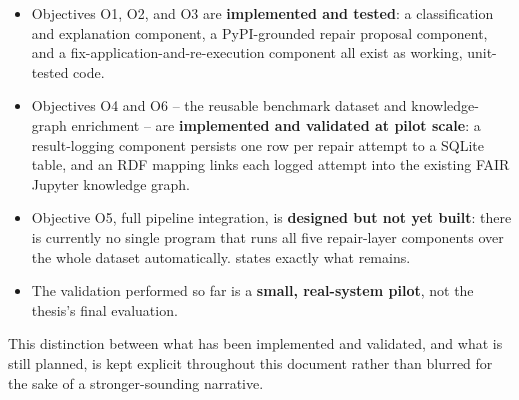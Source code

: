 \begin{itemize}
  \item Objectives O1, O2, and O3 are \textbf{implemented and tested}: a
        classification and explanation component, a PyPI-grounded repair
        proposal component, and a fix-application-and-re-execution component
        all exist as working, unit-tested code.
  \item Objectives O4 and O6 -- the reusable benchmark dataset and
        knowledge-graph enrichment -- are \textbf{implemented and validated
        at pilot scale}: a result-logging component persists one row per
        repair attempt to a SQLite table, and an RDF mapping links each
        logged attempt into the existing FAIR Jupyter knowledge graph.
  \item Objective O5, full pipeline integration, is \textbf{designed but not
        yet built}: there is currently no single program that runs all five
        repair-layer components over the whole dataset automatically.
         states exactly what remains.
  \item The validation performed so far is a
        \textbf{small, real-system pilot}, not the thesis's final
        evaluation.
\end{itemize}

This distinction between what has been implemented and validated, and what
is still planned, is kept explicit throughout this document rather than
blurred for the sake of a stronger-sounding narrative.

